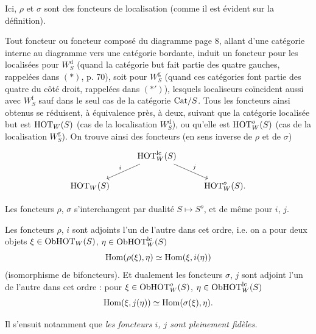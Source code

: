 Ici, $\rho$ et $\sigma$ sont des foncteurs de localisation (comme il est évident sur la définition).

Tout foncteur ou foncteur composé du diagramme page 8, allant d'une catégorie interne au diagramme vers une catégorie bordante, induit un foncteur pour les localisées pour $W_S^{\mathrm{d}}$ (quand la catégorie but fait partie des quatre gauches,
rappelées dans $(*)$, p. 70), soit pour $W_S^{\mathrm{g}}$ (quand ces catégories font partie des quatre du côté droit, rappelées dans $(*')$), lesquels localiseurs coïncident aussi avec $W_S^{\mathrm{f}}$ sauf dans le seul cas de la catégorie $\mathrm{Cat}/S$. Tous les foncteurs ainsi obtenus se réduisent, à équivalence près, à deux, suivant que la catégorie localisée but est $\mathrm{HOT}_W(S)$ (cas de la localisation $W_S^{\mathrm{d}}$), ou qu'elle est $\mathrm{HOT}^o_W(S)$ (cas de la localisation $W_S^{\mathrm{g}}$). On trouve ainsi des foncteurs (en sens inverse de $\rho$ et de $\sigma$)
\[
\begin{tikzcd}
 & \HOT^{\mathrm{lc}}_W(S) \arrow[dl,"i"'] \arrow[dr,"j"] & \\
\HOT_W(S) & & \HOT^o_W(S).
\end{tikzcd}
\]

Les foncteurs $\rho$, $\sigma$ s'interchangent par dualité $S\longmapsto S^o$, et de même pour $i$, $j$.

\quad Les foncteurs $\rho$, $i$ sont adjoints l'un de l'autre dans cet ordre, i.e. on a pour deux objets $\xi\in\mathrm{Ob}\mathrm{HOT}_W(S)$, $\eta\in\mathrm{Ob}\mathrm{HOT}^{\mathrm{lc}}_W(S)$
\[ \operatorname{Hom}(\rho(\xi),\eta)\simeq\operatorname{Hom}(\xi,i(\eta)) \]
(isomorphisme de bifoncteurs). Et dualement les foncteurs $\sigma$, $j$ sont adjoint l'un de l'autre %
dans cet ordre : pour $\xi\in\mathrm{Ob}\mathrm{HOT}^o_W(S)$, $\eta\in\mathrm{Ob}\mathrm{HOT}^{\mathrm{lc}}_W(S)$
\[ \operatorname{Hom}(\xi,j(\eta))\simeq\operatorname{Hom}(\sigma(\xi),\eta). \]

Il s'ensuit notamment que \textit{les foncteurs $i$, $j$ sont pleinement fidèles.}

